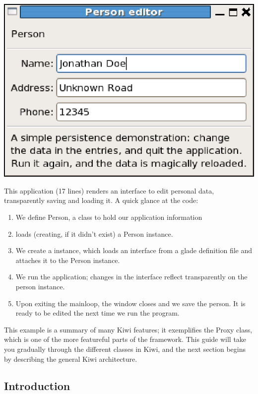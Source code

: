 \documentclass[a4paper]{howto}
\begin{document}
\begin{center}
\includegraphics[scale=0.905]{images/simple.eps}
\end{center}



This application (17 lines) renders an interface to edit personal data,
transparently saving and loading it. A quick glance at the code:

\begin{enumerate}
\item We define Person, a class to hold our application information
\item {} loads (creating, if it didn't exist) a
Person instance.
\item We create a  instance, which loads an interface
from a glade definition file and attaches it to the Person instance.
\item We run the application; changes in the interface reflect
transparently on the person instance.
\item Upon exiting the mainloop, the window closes and we save the
person. It is ready to be edited the next time we run the program.
\end{enumerate}

This example is a summary of many Kiwi features; it exemplifies the
Proxy class, which is one of the more featureful parts of the
framework. This guide will take you gradually through the different
classes in Kiwi, and the next section begins by describing the general
Kiwi architecture.

\subsection{Introduction}
\end{document}
